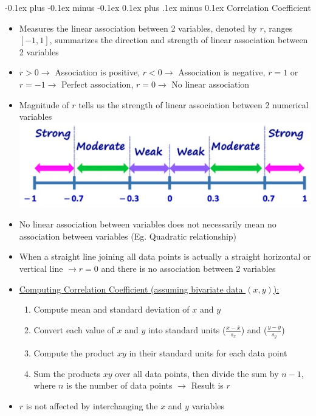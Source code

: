 \documentclass[landscape]{article}
\makeatletter
\renewcommand{\subsection}{\@startsection{subsection}{2}{0mm}%
  {-0.1ex plus -0.1ex minus -0.1ex}%
  {0.1ex plus .1ex minus 0.1ex}%
{\normalfont\scriptsize\bfseries}}
\makeatother
\begin{document}
\begin{multicols*}{5}
    \subsection{Correlation Coefficient}
    \begin{itemize}
      \item Measures the linear association between 2 variables, denoted by $r$, ranges $[-1, 1]$, summarizes the direction and strength of linear association between 2 variables
      \item $r>0 \rightarrow$ Association is positive, $r<0 \rightarrow$ Association is negative, $r=1$ or $r=-1 \rightarrow$ Perfect association, $r=0 \rightarrow$ No linear association 
      \item Magnitude of $r$ tells us the strength of linear association between 2 numerical variables
      \includegraphics[width=0.9\linewidth]{7_r_values.png}
      \item No linear association between variables does not necessarily mean no association between variables (Eg. Quadratic relationship)
      \item When a straight line joining all data points is actually a straight horizontal or vertical line $\rightarrow r=0$ and there is no association between 2 variables
      \item \underline{Computing Correlation Coefficient (assuming bivariate data $(x,y)$):}
      \begin{enumerate}
        \item Compute mean and standard deviation of $x$ and $y$
        \item Convert each value of $x$ and $y$ into standard units ($\frac{x-\overline{x}}{s_x}$) and ($\frac{y-\overline{y}}{s_y}$)
        \item Compute the product $xy$ in their standard units for each data point
        \item Sum the products $xy$ over all data points, then divide the sum by $n-1$, where $n$ is the number of data points $\rightarrow$ Result is $r$
      \end{enumerate}
      \item $r$ is not affected by interchanging the $x$ and $y$ variables

\end{itemize}
\end{multicols*}
\end{document}
